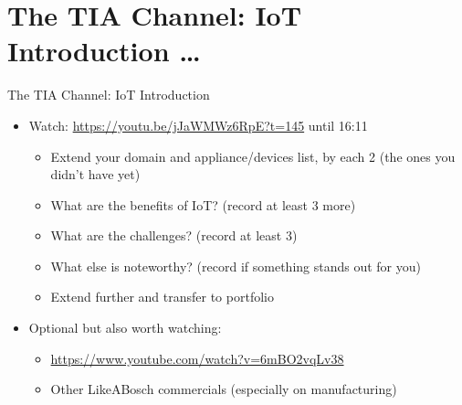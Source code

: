 ﻿\section{The TIA Channel: IoT Introduction \ldots}

\begin{frame}{The TIA Channel: IoT Introduction}
\begin{itemize}
    \item Watch: \href{https://youtu.be/jJaWMWz6RpE?t=145}{\alert{https://youtu.be/jJaWMWz6RpE?t=145}} until 16:11
\begin{itemize}
    \item \alert{Extend your domain and appliance/devices list}, by each 2 (the ones you didn’t have yet)
    \item \alert{What} are the \alert{benefits of IoT}? (record at least 3 more)
    \item \alert{What} are the \alert{challenges}? (record at least 3)
    \item \alert{What} else is \alert{noteworthy}? (record if something stands out for you)
    \item \alert{Extend} further and transfer to \alert{portfolio}
\end{itemize}
\item Optional but also worth watching:
\begin{itemize}
    \item \href{https://www.youtube.com/watch?v=6mBO2vqLv38}{\alert{https://www.youtube.com/watch?v=6mBO2vqLv38}}
    \item \alert{Other LikeABosch} commercials (especially on manufacturing)
\end{itemize}
\end{itemize}
\end{frame}
